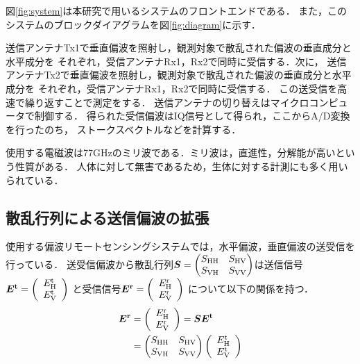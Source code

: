 \documentclass[uplatex,a4paper,10pt]{jsarticle}
\begin{document}
図\ref{fig:system}は本研究で用いるシステムのフロントエンドである．
また，このシステムのブロックダイアグラムを図\ref{fig:diagram}に示す．

送信アンテナTx1で垂直偏波を照射し，観測対象で散乱された偏波の垂直成分と水平成分を
それぞれ，受信アンテナRx1，Rx2で同時に受信する．次に，
送信アンテナTx2で垂直偏波を照射し，観測対象で散乱された偏波の垂直成分と水平成分を
それぞれ，受信アンテナRx1，Rx2で同時に受信する．
この送受信を高速で繰り返すことで測定をする．
送信アンテナの切り替えはマイクロコンピュータで制御する．
得られた受信偏波はIQ信号として得られ，ここからA/D変換を行ったのち，
ストークスベクトルなどを計算する．

使用する電磁波は77GHzのミリ波である．ミリ波は，直進性，分解能が高いという性質がある．
人体に対して無害であるため，生体に対する計測にも多く用いられている．

\subsection{散乱行列による送信偏波の拡張}
使用する偏波リモートセンシングシステムでは，水平偏波，垂直偏波の送受信を行っている．
送受信偏波から散乱行列$\bm{S} = 
\begin{pmatrix}
    S_{\rm{HH}} & S_{\rm{HV}} \\
    S_{\rm{VH}} & S_{\rm{VV}} \\
\end{pmatrix}
    $は送信信号$\bm{E^{\rm{t}}} =
\left(
    \begin{array}{c}
        E_{\rm{H}}^{\rm{t}}\\
        E_{\rm{V}}^{\rm{t}}
    \end{array}
\right)$
  と受信信号$\bm{E^{\rm{r}}} =
\left(
    \begin{array}{c}
        E_{\rm{H}}^{\rm{r}}\\
        E_{\rm{V}}^{\rm{r}}
    \end{array}
\right)$
  について以下の関係を持つ．
\begin{align}\label{equa:9}
    \bm{E^{\rm{r}}} &= 
    \left(
    \begin{array}{c}
        E_{\rm{H}}^{\rm{r}}\\
        E_{\rm{V}}^{\rm{r}}
    \end{array}
    \right)
     = \bm{S}\bm{E^{\rm{t}}} \\
     &=  
    \begin{pmatrix}
        S_{\rm{HH}} & S_{\rm{HV}} \\
        S_{\rm{VH}} & S_{\rm{VV}} \\
    \end{pmatrix}
    \left(
    \begin{array}{c}
        E_{\rm{H}}^{\rm{t}}\notag \\
        E_{\rm{V}}^{\rm{t}}
    \end{array}
    \right)
\end{align}
\end{document}
